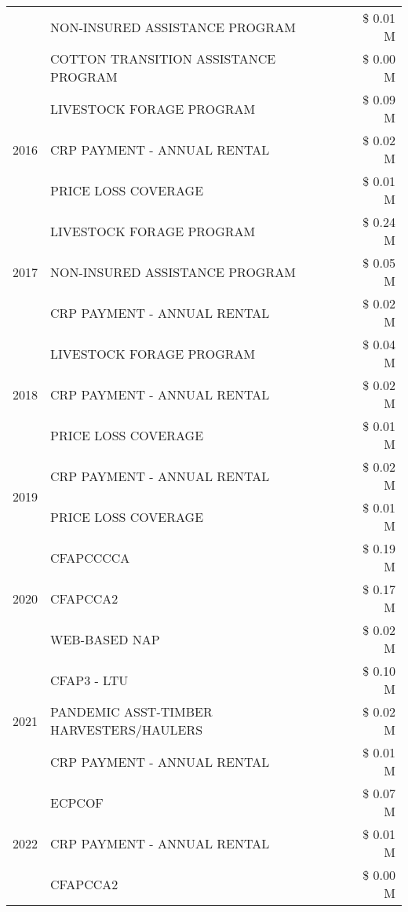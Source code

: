 \begin{tabular}{llr}
 & NON-INSURED ASSISTANCE PROGRAM & \$ 0.01 M \\
 & COTTON TRANSITION ASSISTANCE PROGRAM & \$ 0.00 M \\
\cline{1-3}
\multirow[t]{3}{*}{2016} & LIVESTOCK FORAGE PROGRAM & \$ 0.09 M \\
 & CRP PAYMENT - ANNUAL RENTAL & \$ 0.02 M \\
 & PRICE LOSS COVERAGE & \$ 0.01 M \\
\cline{1-3}
\multirow[t]{3}{*}{2017} & LIVESTOCK FORAGE PROGRAM & \$ 0.24 M \\
 & NON-INSURED ASSISTANCE PROGRAM & \$ 0.05 M \\
 & CRP PAYMENT - ANNUAL RENTAL & \$ 0.02 M \\
\cline{1-3}
\multirow[t]{3}{*}{2018} & LIVESTOCK FORAGE PROGRAM & \$ 0.04 M \\
 & CRP PAYMENT - ANNUAL RENTAL & \$ 0.02 M \\
 & PRICE LOSS COVERAGE & \$ 0.01 M \\
\cline{1-3}
\multirow[t]{2}{*}{2019} & CRP PAYMENT - ANNUAL RENTAL & \$ 0.02 M \\
 & PRICE LOSS COVERAGE & \$ 0.01 M \\
\cline{1-3}
\multirow[t]{3}{*}{2020} & CFAPCCCCA & \$ 0.19 M \\
 & CFAPCCA2 & \$ 0.17 M \\
 & WEB-BASED NAP & \$ 0.02 M \\
\cline{1-3}
\multirow[t]{3}{*}{2021} & CFAP3 - LTU & \$ 0.10 M \\
 & PANDEMIC ASST-TIMBER HARVESTERS/HAULERS & \$ 0.02 M \\
 & CRP PAYMENT - ANNUAL RENTAL & \$ 0.01 M \\
\cline{1-3}
\multirow[t]{3}{*}{2022} & ECPCOF & \$ 0.07 M \\
 & CRP PAYMENT - ANNUAL RENTAL & \$ 0.01 M \\
 & CFAPCCA2 & \$ 0.00 M \\
\cline{1-3}
\bottomrule
\end{tabular}
